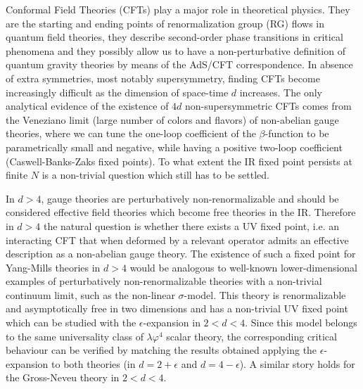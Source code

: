 \documentclass [11pt]{article}
\makeatletter
\def\section{\@startsection {section}{1}{\z@}{-3.5ex plus -1ex minus
 -.2ex}{2.3ex plus .2ex}{\large\bf}}
\makeatother
\begin{document}
\newpage

\tableofcontents

\section{Introduction}
Conformal Field Theories (CFTs) play a major role in theoretical physics.  They are the starting and ending points of renormalization group (RG) flows in quantum field theories,
they describe second-order phase transitions in critical phenomena and they possibly allow us to have a non-perturbative definition of quantum gravity theories by means of the AdS/CFT correspondence. In absence of extra symmetries, most notably  supersymmetry, finding CFTs become increasingly difficult as the dimension of space-time $d$ increases. The only analytical evidence of the existence of $4d$ non-supersymmetric CFTs comes from the Veneziano limit (large number of colors and flavors) of non-abelian gauge theories, where we can tune the one-loop coefficient of the $\beta$-function to be parametrically small and negative, while having a positive two-loop coefficient (Caswell-Banks-Zaks \cite{Caswell:1974gg,Banks:1981nn} fixed points). To what extent the IR fixed point persists at finite $N$ is a non-trivial question which still has to be settled.

In $d>4$, gauge theories are perturbatively non-renormalizable and should be considered effective field theories which become free theories in the IR.
Therefore in $d>4$ the natural question is whether there exists a UV fixed point, i.e. an interacting CFT that when deformed by a relevant operator admits an effective description as a non-abelian gauge theory. The existence of such a fixed point for Yang-Mills theories in $d>4$ would be analogous to well-known lower-dimensional examples of perturbatively non-renormalizable theories with a non-trivial continuum limit, such as the non-linear $\sigma$-model. This theory is renormalizable and asymptotically free in two dimensions and has a non-trivial UV fixed point which can be studied with the $\epsilon$-expansion in $2<d<4$. Since this model belongs to the same universality class of $\lambda\varphi^4$ scalar theory, the corresponding critical behaviour can be verified by matching the results obtained applying the $\epsilon$-expansion to both theories (in $d=2+\epsilon$ and $d=4-\epsilon$). A similar story holds for the Gross-Neveu theory in $2<d<4$. 
\end{document}
